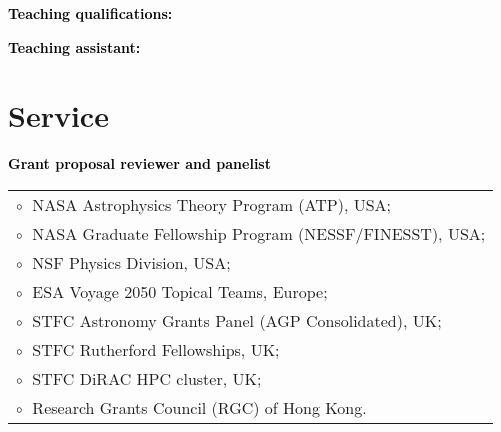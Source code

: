\documentclass[a4paper]{moderncv}
\begin{document}
\vspace{0.2cm}
\textbf{\textcolor{black}{Teaching qualifications:}}\vspace{0.05cm}\\


\vspace{0.2cm}
\textbf{\textcolor{black}{Teaching assistant:}}\vspace{0.05cm}\\
 \vspace{-0.1cm}


\section{Service}

 \textbf{\textcolor{black}{Grant proposal reviewer and panelist}}\vspace{0.1cm}\\
\begin{tabular}{@{\hskip 0.4cm}l}
$\circ\;$ NASA Astrophysics Theory Program (ATP), USA; \\
$\circ\;$ NASA Graduate Fellowship Program (NESSF/FINESST), USA; \\
$\circ\;$ NSF Physics Division, USA;
\\
$\circ\;$ ESA Voyage 2050 Topical Teams, Europe;
 \\
$\circ\;$ STFC Astronomy Grants Panel (AGP Consolidated), UK;
\\
$\circ\;$ STFC Rutherford Fellowships, UK;
\\
$\circ\;$ STFC DiRAC HPC cluster, UK;
\\
$\circ\;$ Research Grants Council (RGC) of Hong Kong.
\end{tabular}
\vspace{0.2cm}
\end{document}
